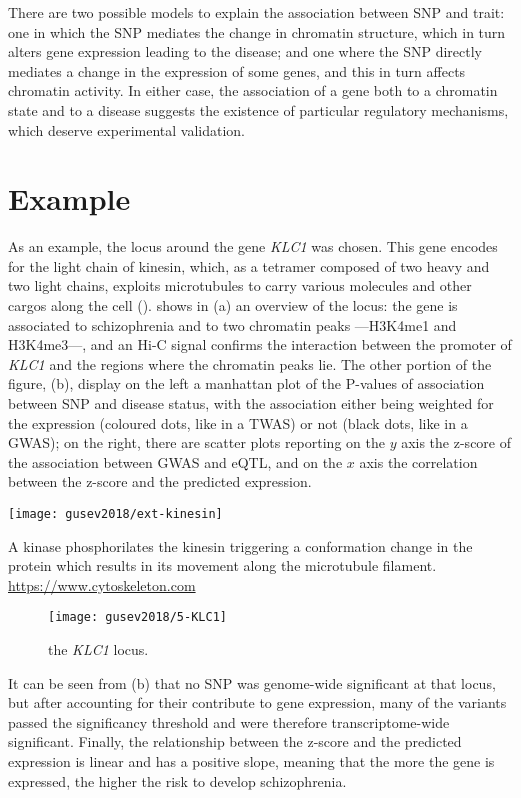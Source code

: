 \documentclass[../main.tex]{subfiles}
\begin{document}
There are two possible models to explain the association between SNP and 
trait: one in which the SNP mediates the change in chromatin structure, 
which in turn alters gene expression leading to the disease; and one 
where the SNP directly mediates a change in the expression of some 
genes, and this in turn affects chromatin activity. In either case, the 
association of a gene both to a chromatin state and to a disease 
suggests the existence of particular regulatory mechanisms, which 
deserve experimental validation.

\section{Example}

As an example, the locus around the gene \textit{KLC1} was chosen. This 
gene encodes for the light chain of kinesin, which, as a tetramer 
composed of two heavy and two light chains, exploits microtubules to 
carry various molecules and other cargos along the cell 
().  shows in (a) an 
overview of the locus: the gene is associated to schizophrenia and to 
two chromatin peaks ---H3K4me1 and H3K4me3---, and an Hi-C signal 
confirms the interaction between the promoter of \textit{KLC1} and the 
regions where the chromatin peaks lie. The other portion of the figure, 
(b), display on the left a manhattan plot of the P-values of association 
between SNP and disease status, with the association either being 
weighted for the expression (coloured dots, like in a TWAS) or not 
(black dots, like in a GWAS); on the right, there are scatter plots 
reporting on the $y$ axis the z-score of the association between GWAS 
and eQTL, and on the $x$ axis the correlation between the z-score and 
the predicted expression.

\begin{marginfigure}[-4.5cm]
	\texttt{[image: gusev2018/ext-kinesin]}
	\caption{A kinase phosphorilates the kinesin triggering a 
conformation change in the protein which results in its movement along 
the microtubule filament. \url{https://www.cytoskeleton.com}}
\end{marginfigure}

\begin{figure}
	\centering
	\texttt{[image: gusev2018/5-KLC1]}
	\caption{the \textit{KLC1} locus.}
\end{figure}

It can be seen from (b) that no SNP was genome-wide significant at that 
locus, but after accounting for their contribute to gene expression, 
many of the variants passed the significancy threshold and were 
therefore transcriptome-wide significant. Finally, the relationship 
between the z-score and the predicted expression is linear and has a 
positive slope, meaning that the more the gene is expressed, the higher 
the risk to develop schizophrenia.
\end{document}
